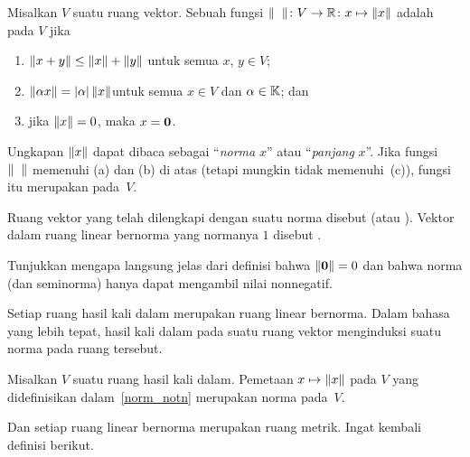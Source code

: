 \begin{defn} Misalkan $V$ suatu ruang vektor. Sebuah fungsi
$\lVert\hphantom{x}\rVert \colon V \rightarrow \mathbb{R} \colon x \mapsto \lVert x\rVert$ adalah
 pada $V$ jika
 \begin{enumerate}
  \item $\lVert x + y\rVert \le \lVert x\rVert + \lVert y\rVert$ \qquad  untuk semua $x$, $y \in V$;
  \item $\lVert\alpha x\rVert = \lvert\alpha\rvert\,\lVert x\rVert$\qquad untuk semua $x \in V$ dan
$\alpha \in \mathbb{K}$; dan
  \item jika $\lVert x\rVert = 0$, maka $x = \mathbf{0}$.
 \end{enumerate}
Ungkapan $\lVert x\rVert$ dapat dibaca sebagai ``\emph{norma} $x$'' atau ``\emph{panjang}
$x$''. Jika fungsi $\lVert\hphantom{x}\rVert$ memenuhi (a) dan (b)
di atas (tetapi mungkin tidak memenuhi~(c)), fungsi itu merupakan
 pada~$V$.

Ruang vektor yang telah dilengkapi dengan suatu norma disebut
 (atau
). Vektor dalam ruang linear bernorma yang normanya $1$ disebut
.
\end{defn}

\begin{exer} Tunjukkan mengapa langsung jelas dari definisi bahwa $\lVert\mathbf{0}\rVert = 0$ dan bahwa norma
(dan seminorma) hanya dapat mengambil nilai nonnegatif.
\end{exer}

Setiap ruang hasil kali dalam merupakan ruang linear bernorma. Dalam bahasa yang lebih tepat, hasil kali dalam pada suatu ruang vektor menginduksi
suatu norma pada ruang tersebut.

\begin{prop}\label{00015025} Misalkan $V$ suatu ruang hasil kali dalam. Pemetaan $x \mapsto \lVert x\rVert$ pada $V$ yang didefinisikan dalam~\ref{norm_notn} merupakan norma pada~$V$.
\end{prop}

Dan setiap ruang linear bernorma merupakan ruang metrik. Ingat kembali definisi berikut.


